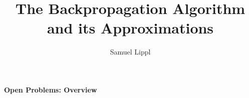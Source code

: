 \documentclass[a4paper,11pt]{article}
\title{The Backpropagation Algorithm and its Approximations}
\author{Samuel Lippl}
\begin{document}
\renewcommand{\abstractname}{\vspace{-\baselineskip}}
\theoremstyle{change} %
\theoremheaderfont{\normalfont\scshape}
\theorembodyfont{\normalfont}
\newtheorem{Def}{Definition}[section]
\newtheorem{The}[Def]{Theorem}
\newtheorem{Lem}[Def]{Lemma}
\newtheorem{Pro}[Def]{Proposition}
\newtheorem{Kor}[Def]{Korollar}
\newtheorem{Bem}[Def]{Bemerkung}
\newtheorem{Not}[Def]{Notation}
\newtheorem{Bei}[Def]{Example}
\newtheorem{Ax}[Def]{Axiom}
\newtheorem{Con}[Def]{Condition}
\newtheorem{Hyp}[Def]{Hypothesis}
\newtheorem{OP}{Open Problem}
\theoremseparator{}
\newtheorem{Abs}[Def]{}
\theoremstyle{nonumberplain}
\theoremheaderfont{\normalfont\itshape}
\theoremsymbol{$\square$}
\newtheorem{Bew}{Proof}
\theoremstyle{change}
\theoremsymbol{}
\theoremheaderfont{\normalfont\scshape}
\newtheorem{BLem}[Def]{Lemma}
\theoremstyle{plain}
\theoremheaderfont{\normalfont\itshape}
\newtheorem{HLem}{Sublemma}[Def]
\newtheorem{BAbs}[HLem]{}
\theoremstyle{nonumberplain}
\theoremheaderfont{\normalfont\itshape}
\theoremsymbol{$\triangle$}
\newtheorem{BBew}{Proof}
\maketitle
\textbf{Open Problems: Overview}\\
\end{document}
